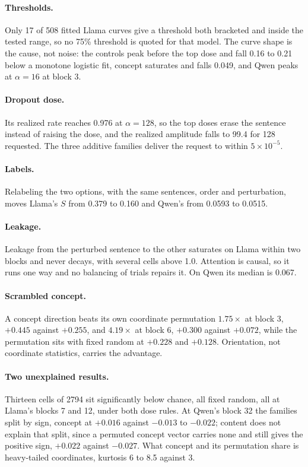 \paragraph{Thresholds.} Only 17 of 508 fitted Llama curves give a threshold
both bracketed and inside the tested range, so no 75\% threshold is quoted for
that model. The curve shape is the cause, not noise: the controls peak before
the top dose and fall 0.16 to 0.21 below a monotone logistic fit, concept
saturates and falls 0.049, and Qwen peaks at $\alpha=16$ at block 3.

\paragraph{Dropout dose.} Its realized rate reaches 0.976 at $\alpha=128$, so
the top doses erase the sentence instead of raising the dose, and the realized
amplitude falls to 99.4 for 128 requested. The three additive families deliver
the request to within $5\times10^{-5}$.

\paragraph{Labels.} Relabeling the two options, with the same sentences, order
and perturbation, moves Llama's $S$ from 0.379 to 0.160 and Qwen's from 0.0593
to 0.0515.

\label{app:loc-contamination}
\paragraph{Leakage.} Leakage from the perturbed sentence to the other
saturates on Llama within two blocks and never decays, with several cells
above 1.0. Attention is causal, so it runs one way and no balancing of trials
repairs it. On Qwen its median is 0.067.

\label{app:loc-scramble}
\paragraph{Scrambled concept.} A concept direction beats its own coordinate
permutation $1.75\times$ at block 3, $+0.445$ against $+0.255$, and
$4.19\times$ at block 6, $+0.300$ against $+0.072$, while the permutation sits
with fixed random at $+0.228$ and $+0.128$. Orientation, not coordinate
statistics, carries the advantage.

\paragraph{Two unexplained results.} Thirteen cells of 2794 sit significantly
below chance, all fixed random, all at Llama's blocks 7 and 12, under both
dose rules. At Qwen's block 32 the families split by sign, concept at $+0.016$
against $-0.013$ to $-0.022$; content does not explain that split, since a
permuted concept vector carries none and still gives the positive sign,
$+0.022$ against $-0.027$. What concept and its permutation share is
heavy-tailed coordinates, kurtosis 6 to 8.5 against 3.
